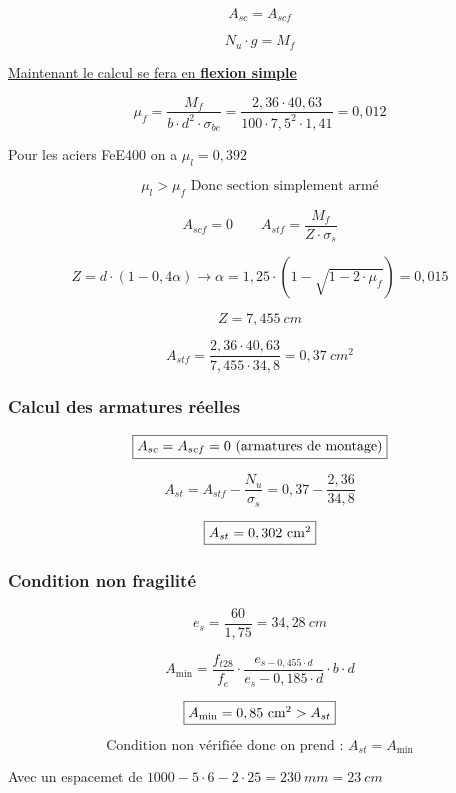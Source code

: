 \documentclass[12pt,a4paper]{report}
\numberwithin{equation}{section}
\begin{document}
	\[ A_{sc} = A_{scf} \]
	
	\[ N_{u} \cdot g = M_{f} \]
	
	
	\underline{Maintenant le calcul se fera en \textbf{flexion simple}}
	
	
	\[ \mu_{f} = \dfrac{M_{f}}{b \cdot d^{2} \cdot \sigma_{bc}} = \dfrac{2,36 \cdot 40,63}{100 \cdot 7,5^{2} \cdot 1,41} = 0,012 \]
	
	Pour les aciers FeE400 on a $\mu_{l} = 0,392$
	
	\[ \mu_{l} > \mu_{f} \text{ Donc section simplement armé} \]
	
	
	\[ A_{scf} = 0 \qquad A_{stf} = \dfrac{M_{f}}{Z \cdot \sigma_{s}} \]
	
	\[ Z = d \cdot (1 - 0,4\alpha) \rightarrow \alpha = 1,25 \cdot (1 - \sqrt{1 - 2 \cdot \mu_{f}}) = 0,015 \]
	
	
	\[ Z = 7,455 ~\unit{cm} \]
	
	\[ A_{stf} = \dfrac{2,36 \cdot 40,63}{7,455 \cdot 34,8} = 0,37 ~\unit{cm^{2}} \]
	
	
	\subsubsection{Calcul des armatures réelles}
	
	\[\fbox{$ A_{sc} = A_{scf} = 0 \text{ (armatures de montage)} $}\]
	
	\[ A_{st} = A_{stf} - \dfrac{N_{u}}{\sigma_{s}} = 0,37 - \dfrac{2,36}{34,8} \]
	
	\[ \fbox{$A_{st} = 0,302 ~\unit{cm^{2}}$} \]
	
	
	\subsubsection{Condition non fragilité}
	
	\[ e_{s} = \dfrac{60}{1,75} = 34,28 ~\unit{cm} \]
	
	\[ A_{\min} = \dfrac{f_{t28}}{f_{e}} \cdot \dfrac{e_{s - 0,455 \cdot d}}{e_{s} - 0,185 \cdot d} \cdot b \cdot d \]
	
	\[ \fbox{$A_{\min} = 0,85 ~\unit{cm^{2}} > A_{st}$} \]
	
	\[ \text{Condition non vérifiée donc on prend : } A_{st} = A_{\min} \]
	
	
	\vspace{\baselineskip}
	
	Avec un espacemet de $1000 - 5 \cdot 6 - 2 \cdot 25 = 230 ~\unit{mm} = 23 ~\unit{cm}$
	
\end{document}
